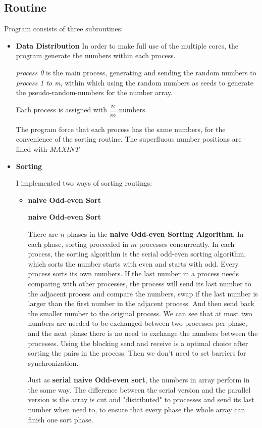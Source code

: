 \documentclass{article}
\newcommand{\cmd}[1]{{\it #1}}
\begin{document}
	\subsection{Routine}
	Program consists of three subroutines:
	\begin{itemize}
		\item
			{\bf Data Distribution}
			In order to make full use of the multiple cores,
			the program generate the numbers within each process.

			\cmd{process 0} is the main process, generating and
			sending the random numbers to \cmd{process 1 to m},
			within which using the random numbers as seeds to
			generate the pseudo-random-numbers for the number
			array.

			Each process is assigned with $\dfrac{n}{m}$ numbers.

			The program force that each process has the same
			numbers, for the convenience of the sorting routine.
			The superfluous number positions are filled with
			\cmd{MAXINT}

		\item
			{\bf Sorting}

				I implemented two ways of sorting routings:
				\begin{itemize}
					\item
						{\bf naive Odd-even Sort}

						{\bf naive Odd-even Sort}

						There are $n$ phases in the {\bf naive Odd-even Sorting Algorithm}.
						In each phase, sorting proceeded in $m$ processes concurrently.
						In each process, the sorting algorithm is the serial
						odd-even sorting algorithm, which sorts the number starts
						with even and starts with odd. Every process sorts its
						own numbers. If the last number in a process needs
						comparing with other processes, the process will
						send its last number to the adjacent process and compare
						the numbers, swap if the last number is larger than
						the first number in the adjacent process. And then
						send back the smaller number to the original process.
						We can see that at most two numbers are needed
						to be exchanged between two processes per phase, and
						the next phase there is no need to exchange the numbers
						between the processes. Using the blocking send and
						receive is a optimal choice after sorting the pairs in
						the process. Then we don't need to set barriers
						for synchronization.

						Just as {\bf serial naive Odd-even sort}, the numbers
						in array perform in the same way. The difference
						between the serial version and the parallel version
						is the array is cut and "distributed" to processes
						and send its last number when need to, to ensure
						that every phase the whole array can finish one sort
						phase.



\end{itemize}
\end{itemize}
\end{document}
